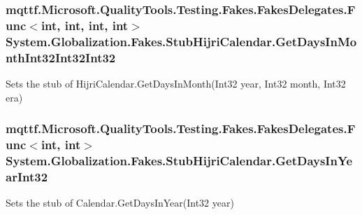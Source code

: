 \hypertarget{class_system_1_1_globalization_1_1_fakes_1_1_stub_hijri_calendar_a30338167a5833f60329027ad683edbe1}{
\subsubsection[{Get\-Days\-In\-Month\-Int32\-Int32\-Int32}]{\setlength{\rightskip}{0pt plus 5cm}mqttf.\-Microsoft.\-Quality\-Tools.\-Testing.\-Fakes.\-Fakes\-Delegates.\-Func$<$int, int, int, int$>$ System.\-Globalization.\-Fakes.\-Stub\-Hijri\-Calendar.\-Get\-Days\-In\-Month\-Int32\-Int32\-Int32}}\label{class_system_1_1_globalization_1_1_fakes_1_1_stub_hijri_calendar_a30338167a5833f60329027ad683edbe1}


Sets the stub of Hijri\-Calendar.\-Get\-Days\-In\-Month(\-Int32 year, Int32 month, Int32 era)

\hypertarget{class_system_1_1_globalization_1_1_fakes_1_1_stub_hijri_calendar_aed636b5e61d7162d3f5ca409d023d33e}{
\subsubsection[{Get\-Days\-In\-Year\-Int32}]{\setlength{\rightskip}{0pt plus 5cm}mqttf.\-Microsoft.\-Quality\-Tools.\-Testing.\-Fakes.\-Fakes\-Delegates.\-Func$<$int, int$>$ System.\-Globalization.\-Fakes.\-Stub\-Hijri\-Calendar.\-Get\-Days\-In\-Year\-Int32}}\label{class_system_1_1_globalization_1_1_fakes_1_1_stub_hijri_calendar_aed636b5e61d7162d3f5ca409d023d33e}


Sets the stub of Calendar.\-Get\-Days\-In\-Year(\-Int32 year)


